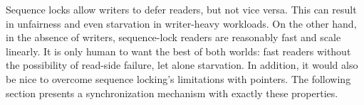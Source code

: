 Sequence locks allow writers to defer readers, but not vice versa.
This can result in unfairness and even starvation
in writer-heavy workloads.
On the other hand, in the absence of writers, sequence-lock readers are
reasonably fast and scale linearly.
It is only human to want the best of both worlds: fast readers without
the possibility of read-side failure, let alone starvation.
In addition, it would also be nice to overcome sequence locking's limitations
with pointers.
The following section presents a synchronization mechanism with exactly
these properties.
